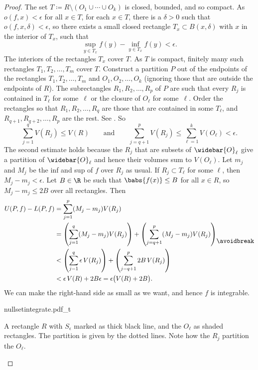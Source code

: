 \begin{proof}
The set $T \coloneqq R \setminus ( O_1 \cup \cdots \cup O_k )$ is closed, bounded,
and so compact.  As $o(f,x) < \epsilon$ for all $x \in T$,
for each $x \in T$, there is a $\delta > 0$ such that
$o(f,x,\delta) < \epsilon$, so there exists a small closed rectangle
$T_x \subset B(x,\delta)$ with $x$ in the interior of $T_x$, such that
\begin{equation*}
\sup_{y\in T_x} f(y) - \inf_{y\in T_x} f(y) < \epsilon.
\end{equation*}
The interiors of the rectangles $T_x$ cover $T$.  As $T$ is compact,
finitely many such rectangles $T_1, T_2, \ldots, T_m$
cover $T$.
Construct a partition $P$ out of the
endpoints of the rectangles $T_1,T_2,\ldots,T_m$
and $O_1,O_2,\ldots,O_k$ (ignoring those that
are outside the endpoints of $R$).  The
subrectangles $R_1,R_2,\ldots,R_p$ of $P$ are
such that every $R_j$ is contained in $T_\ell$ for some~$\ell$
or the closure of $O_\ell$ for some~$\ell$.  Order
the rectangles so that $R_1,R_2,\ldots,R_q$ are those
that are contained in some $T_\ell$, and $R_{q+1},R_{q+2},\ldots,R_{p}$
are the rest.
See .
So
\begin{equation*}
\sum_{j=1}^q V(R_j) \leq V(R)
\qquad \text{and} \qquad
\sum_{j=q+1}^p V(R_j)
\leq
\sum_{\ell=1}^k V(O_\ell)
< \epsilon .
\end{equation*}
The second estimate holds because the $R_j$ that are subsets of $\widebar{O}_\ell$
give a partition of $\widebar{O}_\ell$ and hence their volumes sum to
$V(O_\ell)$.
Let $m_j$ and $M_j$ be the inf and sup of $f$ over $R_j$ as usual.
If $R_j \subset T_\ell$ for some $\ell$, then $M_j-m_j < \epsilon$.
Let $B \in \R$ be such that
$\babs{f(x)} \leq B$ for all $x \in R$, so $M_j-m_j \leq 2B$ over all
rectangles. Then
\begin{equation*}
\begin{split}
U(P,f)-L(P,f)
& =
\sum_{j=1}^p (M_j-m_j) V(R_j)
\\
& =
\left(
\sum_{j=1}^q (M_j-m_j) V(R_j)
\right)
+
\left(
\sum_{j=q+1}^p (M_j-m_j) V(R_j)
\right)
\\
& <
\left(
\sum_{j=1}^q \epsilon\, V(R_j)
\right)
+
\left(
\sum_{j=q+1}^p 2 B\, V(R_j)
\right)
\\
& <
\epsilon\, V(R)
+
2B \epsilon = \epsilon \bigl(V(R)+2B\bigr) .
\end{split}
\avoidbreak
\end{equation*}
We can make the right-hand side as small as we want,
and hence $f$ is integrable.

\begin{myfigureht}
{nullsetintegrate.pdf_t}
\caption{A rectangle $R$ with $S_\epsilon$ marked as thick black line, and the
$O_\ell$ as shaded rectangles.  The partition is given by the dotted
lines.  Note how the $R_j$ partition the $O_\ell$.\label{fig:nullsetintegrate}}
\end{myfigureht}


\end{proof}
